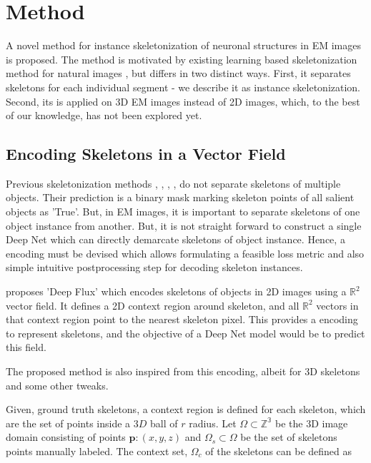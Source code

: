 
\chapter{Method}\label{chapter:method}

A novel method for instance skeletonization of neuronal structures in EM images is proposed. The method is motivated by existing learning based skeletonization method for natural images \cite{Wang2019}, but differs in two distinct ways. First, it separates skeletons for each individual segment - we describe it as instance skeletonization. Second, its is applied on 3D EM images instead of 2D images, which, to the best of our knowledge, has not been explored yet. 
 
\section{Encoding Skeletons in a Vector Field}
Previous skeletonization methods \cite{Shen2016}, \cite{Shen2017}, \cite{Ke2017}, \cite{Wang2019}, \cite{Xu2019} do not separate skeletons of multiple objects. Their prediction is a binary mask marking skeleton points of all salient objects as 'True'. But, in EM images, it is important to separate skeletons of one object instance from another. 
But, it is not straight forward to construct a single Deep Net which can directly demarcate skeletons of object instance. Hence, a encoding must be devised which allows formulating a feasible loss metric and also simple intuitive postprocessing step for decoding skeleton instances. 

\cite{Wang2019} proposes 'Deep Flux' which encodes skeletons of objects in 2D images using a $\mathbb{R}^2$ vector field. It defines a 2D context region around skeleton, and all $\mathbb{R}^2$ vectors in that context region point to the nearest skeleton pixel. This provides a encoding to represent skeletons, and the objective of a Deep Net model would be to predict this field.

The proposed method is also inspired from this encoding, albeit for 3D skeletons and some other tweaks.

Given, ground truth skeletons, a context region is defined for each skeleton, which are the set of points inside a $3D$ ball of $r$ radius.
Let $\Omega \subset \mathbb{Z^3}$  be the 3D image domain consisting of points $\mathbf{p}: (x, y, z)$ and ${\Omega}_s \subset \Omega$ be the set of skeletons points manually labeled. The context set, ${\Omega}_c$ of the skeletons can be defined as

